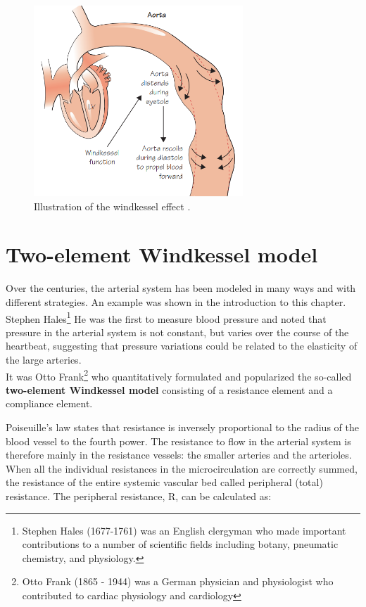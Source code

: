 \begin{figure}[h]
    \centering
    \includegraphics[width=0.7\textwidth]{images/Windkessel/WindkesselEffect(libro).PNG}
    \caption{Illustration of the windkessel effect  \cite{AaronsonPhilipI.PhilipIrving2020Tcsa}.}
    \label{windkesselEffect(libro)}
\end{figure}

\newpage

\section{Two-element Windkessel model}
Over the centuries, the arterial system has been modeled in many ways and with different strategies. An example was shown in the introduction to this chapter.
Stephen Hales\footnote{Stephen Hales (1677-1761) was an English clergyman who made important contributions to a number of scientific fields including botany, pneumatic chemistry, and physiology.} He was the first to measure blood pressure and
noted that pressure in the arterial system is not constant,
but varies over the course of the heartbeat, suggesting that
pressure variations could be related to the elasticity of the large arteries. \\
It was Otto Frank\footnote{Otto Frank (1865 - 1944) was a German physician and physiologist who contributed to cardiac physiology and cardiology} who quantitatively formulated and popularized the so-called \textbf{two-element Windkessel model}
consisting of a resistance element and a compliance element.


Poiseuille's law states that resistance is inversely proportional to the radius of the blood vessel to the fourth power. The
resistance to flow in the arterial system is therefore mainly
in the resistance vessels: the smaller arteries and the
arterioles. When all the individual resistances in the microcirculation are correctly summed, the resistance of the entire
systemic vascular bed called 
peripheral (total) resistance. The peripheral resistance, R, can
be calculated as:

